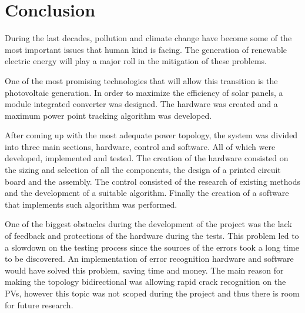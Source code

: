 \chapter{Conclusion}\label{ch:conclusion}






During the last decades, pollution and climate change have become some of the most important issues that human kind is facing. The generation of renewable electric energy will play a major roll in the mitigation of these problems.

One of the most promising technologies that will allow this transition is the photovoltaic generation. 
In order to maximize the efficiency of solar panels, a module integrated converter was designed.
The hardware was created and a maximum power point tracking algorithm was developed.

After coming up with the most adequate power topology, the system was divided into three main sections, hardware, control and software. All of which were developed, implemented and tested.
The creation of the hardware consisted on the sizing and selection of all the components, the design of a printed circuit board and the assembly. The control consisted of the research of existing methods and the development of a suitable algorithm. Finally the creation of a software that implements such algorithm was performed.

One of the biggest obstacles during the development of the project was the lack of feedback and protections of the hardware during the tests. This problem led to a slowdown on the testing process since the sources of the errors took a long time to be discovered. 
An implementation of error recognition hardware and software would have solved this problem, saving time and money.
The main reason for making the topology bidirectional was allowing rapid crack recognition on the PVs, however this topic was not scoped during the project and thus there is room for future research.

